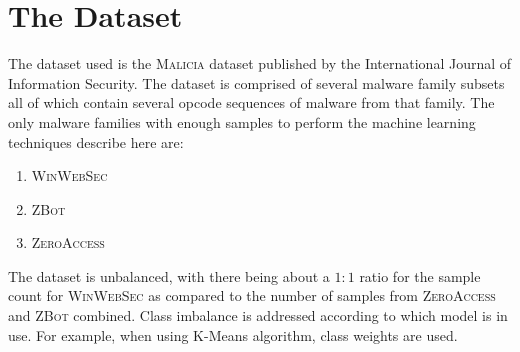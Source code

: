 \documentclass[12pt]{article}
\begin{document}
\section{The Dataset}
The dataset used is the \textsc{Malicia} dataset published by the International Journal of Information Security. The dataset is comprised of several malware family subsets all of which contain several opcode sequences of malware from that family. The only malware families with enough samples to perform the machine learning techniques describe here are: 
\begin{enumerate}
  \item \textsc{WinWebSec}
  \item \textsc{ZBot}
  \item \textsc{ZeroAccess}
\end{enumerate}

The dataset is unbalanced, with there being about a $1:1$ ratio for the sample count for \textsc{WinWebSec} as compared to the number of samples from \textsc{ZeroAccess} and \textsc{ZBot} combined. Class imbalance is addressed according to which model is in use. For example, when using K-Means algorithm, class weights are used.
\end{document}

